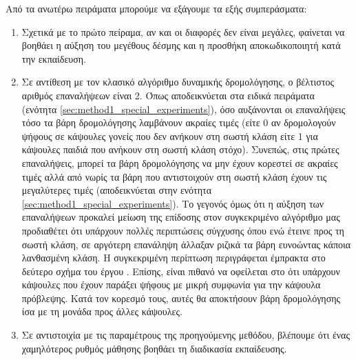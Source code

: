 Από τα ανωτέρω πειράματα μπορούμε να εξάγουμε τα εξής συμπεράσματα:
\begin{enumerate}
    \item Σχετικά με το πρώτο πείραμα, αν και οι διαφορές δεν είναι μεγάλες, φαίνεται να βοηθάει η αύξηση του μεγέθους δέσμης και η προσθήκη αποκωδικοποιητή κατά την εκπαίδευση.
    \item Σε αντίθεση με τον κλασικό αλγόριθμο δυναμικής δρομολόγησης, ο βέλτιστος αριθμός επαναλήψεων είναι 2. Όπως αποδεικνύεται στα ειδικά πειράματα (ενότητα \ref{sec:method1_special_experiments}), όσο αυξάνονται οι επαναλήψεις τόσο τα βάρη δρομολόγησης λαμβάνουν ακραίες τιμές (είτε 0 αν δρομολογούν ψήφους σε κάψουλες γονείς που δεν ανήκουν στη σωστή κλάση είτε 1 για κάψουλες παιδιά που ανήκουν στη σωστή κλάση στόχο). Συνεπώς, στις πρώτες επαναλήψεις, μπορεί τα βάρη δρομολόγησης να μην έχουν κορεστεί σε ακραίες τιμές αλλά από νωρίς τα βάρη που αντιστοιχούν στη σωστή κλάση έχουν τις μεγαλύτερες τιμές (αποδεικνύεται στην ενότητα \ref{sec:method1_special_experiments}). Το γεγονός όμως ότι η αύξηση των επαναλήψεων προκαλεί μείωση της επίδοσης στον συγκεκριμένο αλγόριθμο μας προδιαθέτει ότι υπάρχουν πολλές περιπτώσεις σύγχυσης όπου ενώ έτεινε προς τη σωστή κλάση, σε αργότερη επανάληψη άλλαξαν ριζικά τα βάρη ευνοώντας κάποια λανθασμένη κλάση. Η συγκεκριμένη περίπτωση περιγράφεται έμπρακτα στο δεύτερο σχήμα του έργου \cite{hinton2018matrix}. Επίσης, είναι πιθανό να οφείλεται στο ότι υπάρχουν κάψουλες που έχουν παράξει ψήφους με μικρή συμφωνία για την κάψουλα πρόβλεψης. Κατά τον κορεσμό τους, αυτές θα αποκτήσουν βάρη δρομολόγησης ίσα με τη μονάδα προς άλλες κάψουλες.
    \item Σε αντιστοιχία με τις παραμέτρους της προηγούμενης μεθόδου, βλέπουμε ότι ένας χαμηλότερος ρυθμός μάθησης βοηθάει τη διαδικασία εκπαίδευσης.
\end{enumerate}
